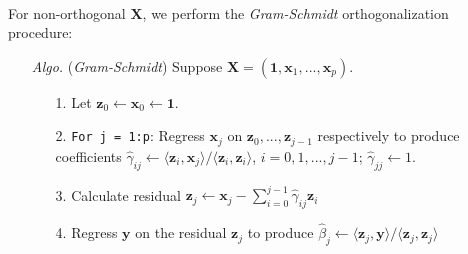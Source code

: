 \documentclass[a4paper, 11pt]{article}
\begin{document}
\begin{itemize}
	~\\ 
	For non-orthogonal $\bm{X}$, we perform the \emph{Gram-Schmidt} orthogonalization procedure:
	\begin{itemize}
		\item[\textit{Algo.}] (\emph{Gram-Schmidt}) Suppose $\bm{X}=(\bm{1}, \bm{x}_1, ..., \bm{x}_p)$.
		\begin{itemize}
			\item[1.] Let $\bm{z}_0 \leftarrow  \bm{x}_0 \leftarrow  \bm{1}$.
			\item[2.] \texttt{For j = 1:p}: Regress $\bm{x}_j$ on $\bm{z}_0, ..., \bm{z}_{j-1}$ respectively to produce coefficients $\hat{\gamma}_{ij} \leftarrow \langle \bm{z}_i, \bm{x}_j \rangle / \langle \bm{z}_i, \bm{z}_i \rangle$, $i=0,1,...,j-1$; $\hat{\gamma}_{jj} \leftarrow 1$.
			\item[3.] Calculate residual $\bm{z}_j \leftarrow \bm{x}_j - \sum_{i=0}^{j-1} \hat{\gamma}_{ij} \bm{z}_i$ 
			\item[4.] Regress $\bm{y}$ on the residual $\bm{z}_j$ to produce $\hat{\beta}_j \leftarrow \langle \bm{z}_j, \bm{y} \rangle / \langle \bm{z}_j, \bm{z}_j \rangle$
		\end{itemize}


\end{itemize}
\end{itemize}
\end{document}
